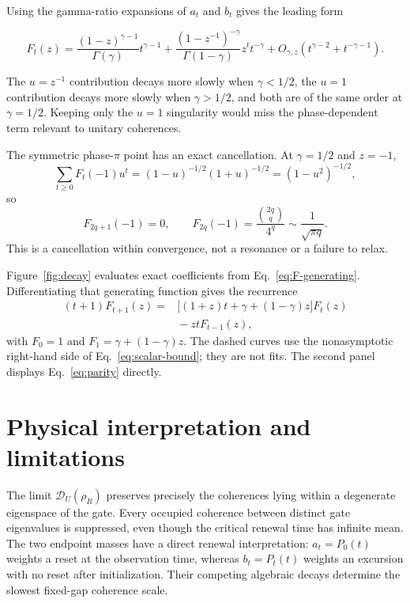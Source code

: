 \documentclass[aps,pra,reprint,superscriptaddress,longbibliography,nofootinbib]{revtex4-2}
\newcommand{\cD}{\mathcal D}
\begin{document}
Using the gamma-ratio expansions of $a_t$ and $b_t$ gives the leading form
\begin{widetext}
\begin{equation}
 F_t(z)=\frac{(1-z)^{\gamma-1}}{\Gamma(\gamma)}t^{\gamma-1}
 +\frac{(1-z^{-1})^{-\gamma}}{\Gamma(1-\gamma)}z^tt^{-\gamma}
 +O_{\gamma,z}\!\left(t^{\gamma-2}+t^{-\gamma-1}\right).
 \label{eq:darboux-power}
\end{equation}
\end{widetext}
The $u=z^{-1}$ contribution decays more slowly when $\gamma<1/2$, the
$u=1$ contribution decays more slowly when $\gamma>1/2$, and both are of
the same order at $\gamma=1/2$.  Keeping only the $u=1$ singularity would
miss the phase-dependent term relevant to unitary coherences.

The symmetric phase-$\pi$ point has an exact cancellation.  At
$\gamma=1/2$ and $z=-1$,
\begin{equation}
 \sum_{t\geq0}F_t(-1)u^t
 =(1-u)^{-1/2}(1+u)^{-1/2}=(1-u^2)^{-1/2},
 \label{eq:parity-gf}
\end{equation}
so
\begin{equation}
 \boxed{F_{2q+1}(-1)=0,\qquad
 F_{2q}(-1)=\frac{\binom{2q}{q}}{4^q}
 \sim\frac{1}{\sqrt{\pi q}}.}
 \label{eq:parity}
\end{equation}
This is a cancellation within convergence, not a resonance or a failure to
relax.

Figure~\ref{fig:decay} evaluates exact coefficients from
Eq.~\eqref{eq:F-generating}.  Differentiating that generating function gives
the recurrence
\begin{equation}
 \begin{split}
 (t+1)F_{t+1}(z)={}&\bigl[(1+z)t+\gamma+(1-\gamma)z\bigr]F_t(z)\\
 &{}-ztF_{t-1}(z),
 \end{split}
 \label{eq:coefficient-recurrence}
\end{equation}
with $F_0=1$ and $F_1=\gamma+(1-\gamma)z$.  The dashed curves use the
nonasymptotic right-hand side of Eq.~\eqref{eq:scalar-bound}; they are not
fits.  The second panel displays Eq.~\eqref{eq:parity} directly.

\section{Physical interpretation and limitations}

The limit $\cD_U(\rho_R)$ preserves precisely the coherences lying within a
degenerate eigenspace of the gate.  Every occupied coherence between distinct
gate eigenvalues is suppressed, even though the critical renewal time has
infinite mean.  The two endpoint masses have a direct renewal interpretation:
$a_t=P_0(t)$ weights a reset at the observation time, whereas
$b_t=P_t(t)$ weights an excursion with no reset after initialization.  Their
competing algebraic decays determine the slowest fixed-gap coherence scale.
\end{document}
